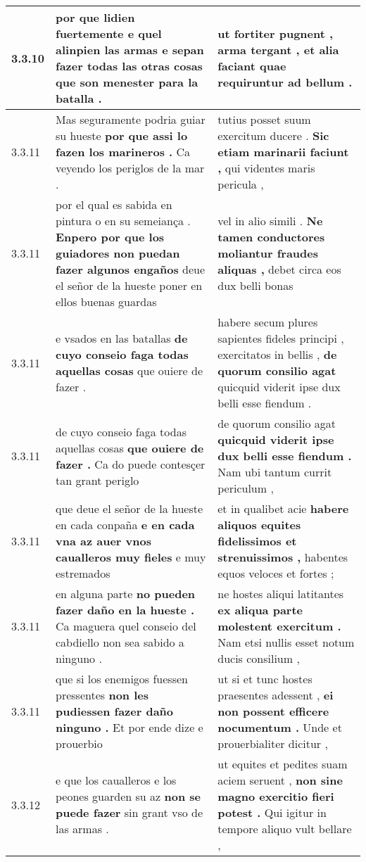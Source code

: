 \begin{tabular}{|p{1cm}|p{6.5cm}|p{6.5cm}|}
3.3.10 & por que lidien fuertemente e quel alinpien las armas \textbf{ e sepan fazer todas las otras cosas } que son menester para la batalla . & ut fortiter pugnent , arma tergant , \textbf{ et alia faciant } quae requiruntur ad bellum . \\\hline
3.3.11 & Mas seguramente podria guiar su hueste \textbf{ por que assi lo fazen los marineros . } Ca veyendo los periglos de la mar . & tutius posset suum exercitum ducere . \textbf{ Sic etiam marinarii faciunt , } qui videntes maris pericula , \\\hline
3.3.11 & por el qual es sabida en pintura o en su semeiança . \textbf{ Enpero por que los guiadores non puedan fazer algunos engaños } deue el señor de la hueste poner en ellos buenas guardas & vel in alio simili . \textbf{ Ne tamen conductores moliantur fraudes aliquas , } debet circa eos dux belli bonas \\\hline
3.3.11 & e vsados en las batallas \textbf{ de cuyo conseio faga todas aquellas cosas } que ouiere de fazer . & habere secum plures sapientes fideles principi , exercitatos in bellis , \textbf{ de quorum consilio agat } quicquid viderit ipse dux belli esse fiendum . \\\hline
3.3.11 & de cuyo conseio faga todas aquellas cosas \textbf{ que ouiere de fazer . } Ca do puede contesçer tan grant periglo & de quorum consilio agat \textbf{ quicquid viderit ipse dux belli esse fiendum . } Nam ubi tantum currit periculum , \\\hline
3.3.11 & que deue el señor de la hueste en cada conpaña \textbf{ e en cada vna az auer vnos caualleros muy fieles } e muy estremados & et in qualibet acie \textbf{ habere aliquos equites fidelissimos et strenuissimos , } habentes equos veloces et fortes ; \\\hline
3.3.11 & en alguna parte \textbf{ no pueden fazer daño en la hueste . } Ca maguera quel conseio del cabdiello non sea sabido a ninguno . & ne hostes aliqui latitantes \textbf{ ex aliqua parte molestent exercitum . } Nam etsi nullis esset notum ducis consilium , \\\hline
3.3.11 & que si los enemigos fuessen pressentes \textbf{ non les pudiessen fazer daño ninguno . } Et por ende dize e prouerbio & ut si et tunc hostes praesentes adessent , \textbf{ ei non possent efficere nocumentum . } Unde et prouerbialiter dicitur , \\\hline
3.3.12 & e que los caualleros e los peones guarden su az \textbf{ non se puede fazer } sin grant vso de las armas . & ut equites et pedites suam aciem seruent , \textbf{ non sine magno exercitio fieri potest . } Qui igitur in tempore aliquo vult bellare , \\\hline

\end{tabular}
